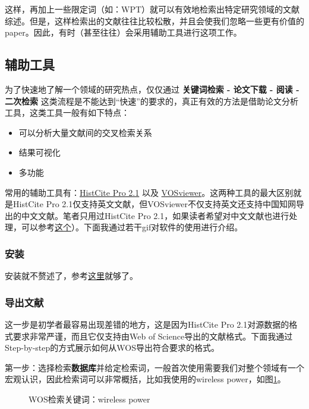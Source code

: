 \documentclass[UTF8]{ctexbook}
\begin{document}
这样，再加上一些限定词（如：WPT）就可以有效地检索出特定研究领域的文献综述。但是，这样检索出的文献往往比较松散，并且会使我们忽略一些更有价值的paper。因此，有时（甚至往往）会采用辅助工具进行这项工作。

\subsection{辅助工具}
为了快速地了解一个领域的研究热点，仅仅通过 {\bf 关键词检索 - 论文下载 - 阅读 - 二次检索} 这类流程是不能达到“快速”的要求的，真正有效的方法是借助论文分析工具，这类工具一般有如下特点：

\begin{itemize}
	\item 可以分析大量文献间的交叉检索关系
	\item 结果可视化
	\item 多功能
\end{itemize}

常用的辅助工具有：\href{https://zhuanlan.zhihu.com/p/20902898}{HistCite Pro 2.1} 以及 \href{https://zhuanlan.zhihu.com/p/30970993}{VOSviewer}。这两种工具的最大区别就是HistCite Pro 2.1仅支持英文文献，但VOSviewer不仅支持英文还支持中国知网导出的中文文献。笔者只用过HistCite Pro 2.1，如果读者希望对中文文献也进行处理，可以参考\href{https://www.jianshu.com/p/e20f3f1d17d8}{这个}）。下面我通过若干gif对软件的使用进行介绍。
\subsubsection{安装}
安装就不赘述了，参考\href{https://zhuanlan.zhihu.com/p/20902898}{这里}就够了。
\subsubsection{导出文献}
这一步是初学者最容易出现差错的地方，这是因为HistCite Pro 2.1对源数据的格式要求非常严谨，而且它仅支持由Web of Science导出的文献格式。下面我通过Step-by-step的方式展示如何从WOS导出符合要求的格式。

第一步：选择检索{\bf 数据库}并给定检索词，一般首次使用需要我们对整个领域有一个宏观认识，因此检索词可以非常概括，比如我使用的wireless power，如图\ref{fig:1}。

\begin{figure}[!htb]
	\centering
	\vspace{-0.3cm}
	\caption{WOS检索关键词：wireless power}\label{fig:1}
\end{figure}
\end{document}
